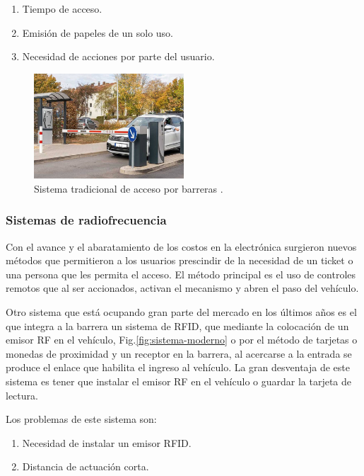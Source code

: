 \begin{enumerate}
    \item Tiempo de acceso.
    \item Emisión de papeles de un solo uso.
    \item Necesidad de acciones por parte del usuario.
\end{enumerate}

\begin{figure}[bth]
    \centering
    \includegraphics[width=0.5\textwidth]{imgs/sistema-control-acceso-barreras.jpg}
    \caption{Sistema tradicional de acceso por barreras \cite{integralia_sistema_2019}.}
    \label{fig:sistema-tradicional}
\end{figure}

\subsubsection*{Sistemas de radiofrecuencia}

Con el avance y el abaratamiento de los costos en la electrónica surgieron nuevos métodos que permitieron a los usuarios prescindir de la necesidad de un ticket o una persona que les permita el acceso. El método principal es el uso de controles remotos que al ser accionados, activan el mecanismo y abren el paso del vehículo.

Otro sistema que está ocupando gran parte del mercado en los últimos años es el que integra a la barrera un sistema de RFID, que mediante la colocación de un emisor RF en el vehículo, Fig.\ref{fig:sistema-moderno} o por el método de tarjetas o monedas de proximidad y un receptor en la barrera, al acercarse a la entrada se produce el enlace que habilita el ingreso al vehículo. La gran desventaja de este sistema es tener que instalar el emisor RF en el vehículo o guardar la tarjeta de lectura.

Los problemas de este sistema son:

\begin{enumerate}
    \item Necesidad de instalar un emisor RFID.
    \item Distancia de actuación corta.
\end{enumerate}

